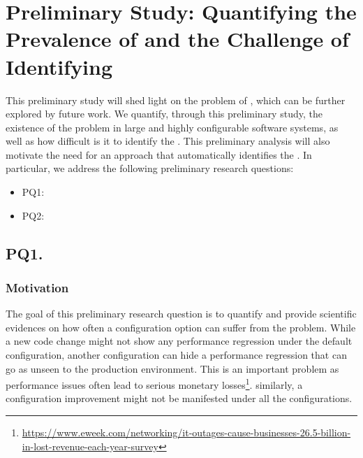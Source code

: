 
\section{Preliminary Study: Quantifying the Prevalence of \inconsistent and the Challenge of Identifying \inconsistent } \label{sec:pq-results}

This preliminary study will shed light on the problem of \inconsistent, which can be further explored by future work. We quantify, through this preliminary study, the existence of the \inconsistent problem in large and highly configurable software systems, as well as how difficult is it to identify the \inconsistent. 
This preliminary analysis will also motivate the need for an approach that automatically identifies the \inconsistent. 
In particular, we address the following preliminary research questions: 

\begin{itemize}
    \item[] PQ1: \PQI
    \item[] PQ2: \PQII
\end{itemize}

\subsection*{\textbf{PQ1. \PQI}}
\label{sec:rq1}
\subsubsection*{Motivation}
The goal of this preliminary research question is to quantify and provide scientific evidences on how often a configuration option can suffer from the \inconsistent problem. %
While a new code change might not show any performance regression under the default configuration, another configuration can hide a performance regression that can go as unseen to the production environment. This is an important problem as performance issues often lead to serious monetary losses\footnote{\url{https://www.eweek.com/networking/it-outages-cause-businesses-26.5-billion-in-lost-revenue-each-year-survey}}. similarly, a configuration improvement might not be manifested under all the configurations.  %

